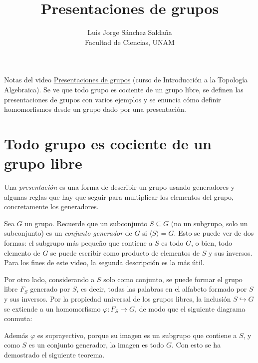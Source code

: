 \documentclass[11pt]{article}
\title{Presentaciones de grupos}
\author{Luis Jorge Sánchez Saldaña\\[2pt]\small Facultad de Ciencias, UNAM}
\date{}
\begin{document}
\maketitle

\noindent\small Notas del video
\href{https://www.youtube.com/watch?v=V3OboR_tSEM}{\guillemotleft{}Presentaciones de grupos\guillemotright{}}
(curso de Introducción a la Topología Algebraica). Se ve que todo grupo es cociente de un grupo libre, se definen las presentaciones de grupos con varios ejemplos y se enuncia cómo definir homomorfismos desde un grupo dado por una presentación.
\normalsize

\section*{Todo grupo es cociente de un grupo libre}

Una \emph{presentación} es una forma de describir un grupo usando generadores y algunas reglas que hay que seguir para multiplicar los elementos del grupo, concretamente los generadores.

Sea $G$ un grupo. Recuerde que un subconjunto $S\subseteq G$ (no un subgrupo, solo un subconjunto) es un \emph{conjunto generador} de $G$ si $\langle S\rangle=G$. Esto se puede ver de dos formas: el subgrupo más pequeño que contiene a $S$ es todo $G$, o bien, todo elemento de $G$ se puede escribir como producto de elementos de $S$ y sus inversos. Para los fines de este video, la segunda descripción es la más útil.

Por otro lado, considerando a $S$ solo como conjunto, se puede formar el grupo libre $F_S$ generado por $S$, es decir, todas las palabras en el alfabeto formado por $S$ y sus inversos. Por la propiedad universal de los grupos libres, la inclusión $S\hookrightarrow G$ se extiende a un homomorfismo $\varphi\colon F_S\to G$, de modo que el siguiente diagrama conmuta:

\begin{center}
\end{center}

Además $\varphi$ es suprayectivo, porque su imagen es un subgrupo que contiene a $S$, y como $S$ es un conjunto generador, la imagen es todo $G$. Con esto se ha demostrado el siguiente teorema.
\end{document}
